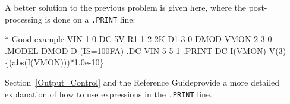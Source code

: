 A better solution to the previous problem is given here, where the
post-processing is done on a \verb|.PRINT| line:

\begin{vquote}
\color{blue}* Good example \color{black}
VIN 1 0 DC 5V
R1 1 2 2K
D1 3 0 DMOD
VMON 2 3 0
.MODEL DMOD D (IS=100FA)
.DC VIN 5 5 1
.PRINT DC I(VMON) V(3) \color{XyceRed} \{(abs(I(VMON)))*1.0e-10\} \color{black}
\end{vquote}

Section~\ref{Output_Control} and the \Xyce{} Reference
Guide\ReferenceGuide provide a more detailed explanation of how to use
expressions in the \texttt{.PRINT} line.


